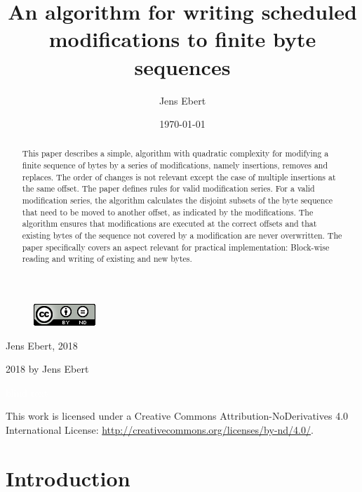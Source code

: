 \documentclass[english, 10pt, openright, twocolumn, landscape, twoside, notitlepage, a4paper, pdftex]		
{article}
\title{An algorithm for writing scheduled modifications to finite byte sequences}
\author{Jens Ebert}
\date{\today}
\begin{document}
\maketitle



\begin{figure}
\includegraphics{figures/CClicense_BY_ND.PNG}
\end{figure}

Jens Ebert, 2018

\textcopyright{} 2018 by Jens Ebert

\textcolor{white}{blind text} \linebreak

This work is licensed under a Creative Commons Attribution-NoDerivatives 4.0 International License: \url{http://creativecommons.org/licenses/by-nd/4.0/}.

\begin{abstract}
This paper describes a simple, algorithm with quadratic complexity for modifying a finite sequence of bytes by a series of modifications, namely insertions, removes and replaces. The order of changes is not relevant except the case of multiple insertions at the same offset. The paper defines rules for valid modification series. For a valid modification series, the algorithm calculates the disjoint subsets of the byte sequence that need to be moved to another offset, as indicated by the modifications. The algorithm ensures that modifications are executed at the correct offsets and that existing bytes of the sequence not covered by a modification are never overwritten. The paper specifically covers an aspect relevant for practical implementation: Block-wise reading and writing of existing and new bytes.
\end{abstract}


\section{Introduction}%
\label{sec:Introduction}%
\end{document}
